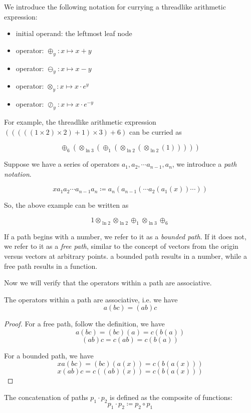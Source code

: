 We introduce the following notation for currying a threadlike arithmetic expression:
\begin{itemize}
    \item initial operand: the leftmost leaf node
    \item operator: $\oplus_y: x \mapsto x + y$
    \item operator: $\ominus_y: x \mapsto x - y$
    \item operator: $\otimes_y: x \mapsto x \cdot e^y$
    \item operator: $\oslash_y: x \mapsto x \cdot e^{-y}$
\end{itemize}

For example, the threadlike arithmetic expression $(((((1 \times 2) \times 2) + 1) \times 3) + 6)$ can be curried as

$$\oplus_6(\otimes_{\ln 3}(\oplus_1(\otimes_{\ln 2}(\otimes_{\ln 2}(1)))))$$

Suppose we have a series of operators $a_1, a_2, \cdots a_{n-1}, a_n$, we introduce a \emph{path notation}.

$$x a_1 a_2 \cdots a_{n-1} a_n \coloneqq a_n( a_{n-1}( \cdots a_2( a_1(x) ) \cdots ) )$$

So, the above example can be written as

$$1 \otimes_{\ln 2} \otimes_{\ln 2} \oplus_1 \otimes_{\ln 3} \oplus_6 $$

If a path begins with a number, we refer to it as a \emph{bounded path}.
If it does not, we refer to it as a \emph{free path}, similar to the concept of vectors from the origin versus vectors at arbitrary points.
a bounded path results in a number, while a free path results in a function.

Now we will verify that the operators within a path are associative.

\begin{lemma}\label{lemma:associative}
    The operators within a path are associative, i.e. we have $$a (b c) = (a b) c$$
\end{lemma}

\begin{proof}
For a free path, follow the definition, we have
$$a (b c) = (b c)(a) = c(b(a))$$
$$(a b) c = c (a b) = c(b(a))$$

For a bounded path, we have
$$x a (b c) = (b c)(a(x)) = c(b(a(x)))$$
$$x (a b) c = c((a b)(x)) = c(b(a(x)))$$
\end{proof}

\begin{definition}\label{definition:concatenate}
    The concatenation of paths $p_1 \cdot p_2$ is defined as the composite of functions:
    $$p_1 \cdot p_2 \coloneqq p_2 \circ p_1 $$
\end{definition}


